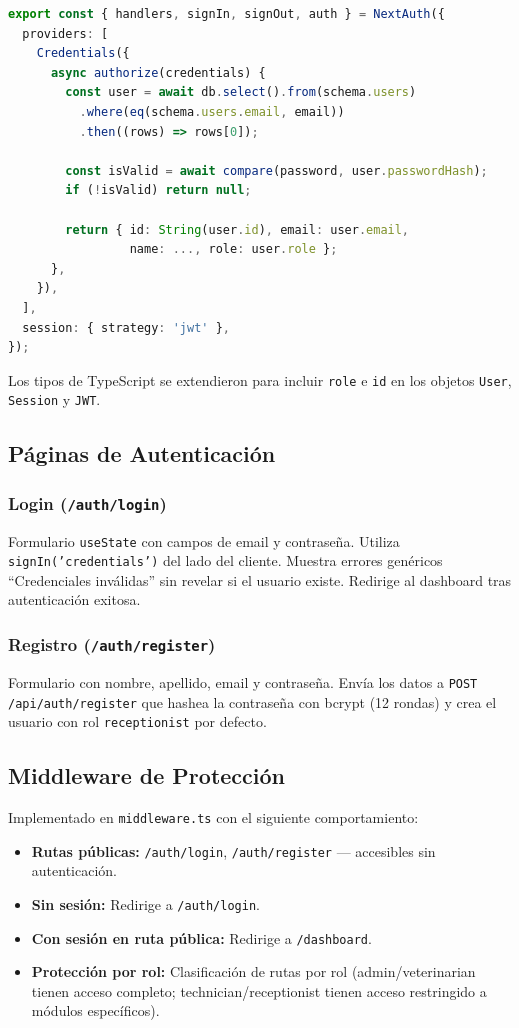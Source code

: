 \documentclass[12pt,a4paper]{article}
\begin{document}
\begin{lstlisting}[language=TypeScript, caption=Configuración de NextAuth]
export const { handlers, signIn, signOut, auth } = NextAuth({
  providers: [
    Credentials({
      async authorize(credentials) {
        const user = await db.select().from(schema.users)
          .where(eq(schema.users.email, email))
          .then((rows) => rows[0]);

        const isValid = await compare(password, user.passwordHash);
        if (!isValid) return null;

        return { id: String(user.id), email: user.email,
                 name: ..., role: user.role };
      },
    }),
  ],
  session: { strategy: 'jwt' },
});
\end{lstlisting}

Los tipos de TypeScript se extendieron para incluir \texttt{role} e \texttt{id}
en los objetos \texttt{User}, \texttt{Session} y \texttt{JWT}.

\subsection{Páginas de Autenticación}

\subsubsection{Login (\texttt{/auth/login})}
Formulario \texttt{useState} con campos de email y contraseña. Utiliza
\texttt{signIn('credentials')} del lado del cliente. Muestra errores genéricos
``Credenciales inválidas'' sin revelar si el usuario existe. Redirige al
dashboard tras autenticación exitosa.

\subsubsection{Registro (\texttt{/auth/register})}
Formulario con nombre, apellido, email y contraseña. Envía los datos a
\texttt{POST /api/auth/register} que hashea la contraseña con bcrypt
(12 rondas) y crea el usuario con rol \texttt{receptionist} por defecto.

\subsection{Middleware de Protección}

Implementado en \texttt{middleware.ts} con el siguiente comportamiento:

\begin{itemize}[leftmargin=*]
    \item \textbf{Rutas públicas:} \texttt{/auth/login}, \texttt{/auth/register}
          --- accesibles sin autenticación.
    \item \textbf{Sin sesión:} Redirige a \texttt{/auth/login}.
    \item \textbf{Con sesión en ruta pública:} Redirige a \texttt{/dashboard}.
    \item \textbf{Protección por rol:} Clasificación de rutas por rol
          (admin/veterinarian tienen acceso completo; technician/receptionist
          tienen acceso restringido a módulos específicos).
\end{itemize}
\end{document}
